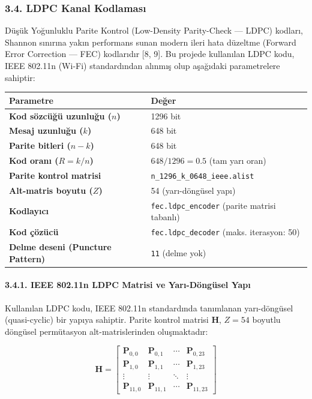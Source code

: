 \documentclass[
]{IEEEtran}
\newcounter{none} %
\begin{document}
\subsubsection{3.4. LDPC Kanal
Kodlaması}\label{ldpc-kanal-kodlamasux131}

Düşük Yoğunluklu Parite Kontrol (Low-Density Parity-Check --- LDPC)
kodları, Shannon sınırına yakın performans sunan modern ileri hata
düzeltme (Forward Error Correction --- FEC) kodlarıdır {[}8, 9{]}. Bu
projede kullanılan LDPC kodu, IEEE 802.11n (Wi-Fi) standardından alınmış
olup aşağıdaki parametrelere sahiptir:

{\def\LTcaptype{none} %
\begin{longtable}[]{@{}ll@{}}
\toprule\noalign{}
Parametre & Değer \\
\midrule\noalign{}
\endhead
\bottomrule\noalign{}
\endlastfoot
\textbf{Kod sözcüğü uzunluğu (\(n\))} & 1296 bit \\
\textbf{Mesaj uzunluğu (\(k\))} & 648 bit \\
\textbf{Parite bitleri (\(n - k\))} & 648 bit \\
\textbf{Kod oranı (\(R = k/n\))} & \(648/1296 = 0.5\) (tam yarı oran) \\
\textbf{Parite kontrol matrisi} &
\texttt{n\_1296\_k\_0648\_ieee.alist} \\
\textbf{Alt-matris boyutu (\(Z\))} & 54 (yarı-döngüsel yapı) \\
\textbf{Kodlayıcı} & \texttt{fec.ldpc\_encoder} (parite matrisi
tabanlı) \\
\textbf{Kod çözücü} & \texttt{fec.ldpc\_decoder} (maks. iterasyon:
50) \\
\textbf{Delme deseni (Puncture Pattern)} &
\texttt{\textquotesingle{}11\textquotesingle{}} (delme yok) \\
\end{longtable}
}

\paragraph{3.4.1. IEEE 802.11n LDPC Matrisi ve Yarı-Döngüsel
Yapı}\label{ieee-802.11n-ldpc-matrisi-ve-yarux131-duxf6nguxfcsel-yapux131}

Kullanılan LDPC kodu, IEEE 802.11n standardında tanımlanan yarı-döngüsel
(quasi-cyclic) bir yapıya sahiptir. Parite kontrol matrisi
\(\mathbf{H}\), \(Z = 54\) boyutlu döngüsel permütasyon
alt-matrislerinden oluşmaktadır:

\[\mathbf{H} = \begin{bmatrix} \mathbf{P}_{0,0} & \mathbf{P}_{0,1} & \cdots & \mathbf{P}_{0,23} \\ \mathbf{P}_{1,0} & \mathbf{P}_{1,1} & \cdots & \mathbf{P}_{1,23} \\ \vdots & \vdots & \ddots & \vdots \\ \mathbf{P}_{11,0} & \mathbf{P}_{11,1} & \cdots & \mathbf{P}_{11,23} \end{bmatrix}\]
\end{document}
